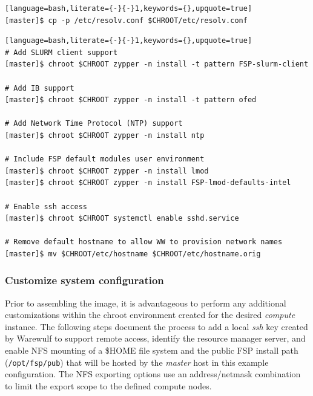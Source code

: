 \documentclass[letterpaper]{article}
\begin{document}
\begin{lstlisting}[language=bash,literate={-}{-}1,keywords={},upquote=true]
[master]$ cp -p /etc/resolv.conf $CHROOT/etc/resolv.conf
\end{lstlisting}


\begin{lstlisting}[language=bash,literate={-}{-}1,keywords={},upquote=true]
# Add SLURM client support
[master]$ chroot $CHROOT zypper -n install -t pattern FSP-slurm-client

# Add IB support
[master]$ chroot $CHROOT zypper -n install -t pattern ofed

# Add Network Time Protocol (NTP) support
[master]$ chroot $CHROOT zypper -n install ntp

# Include FSP default modules user environment
[master]$ chroot $CHROOT zypper -n install lmod 
[master]$ chroot $CHROOT zypper -n install FSP-lmod-defaults-intel

# Enable ssh access 
[master]$ chroot $CHROOT systemctl enable sshd.service

# Remove default hostname to allow WW to provision network names
[master]$ mv $CHROOT/etc/hostname $CHROOT/etc/hostname.orig
\end{lstlisting}


\subsubsection{Customize system configuration} \label{sec:master_customization}

Prior to assembling the image, it is advantageous to perform any additional
customizations within the chroot environment created for the desired {\em
  compute} instance. The following steps document the process to add a local
{\em ssh} key created by Warewulf to support remote access, identify the
resource manager server, and enable NFS mounting of a \$HOME file system and
the public FSP install path (\texttt{/opt/fsp/pub}) that will be hosted by the
{\em master} host in this example configuration.  The NFS exporting options use
an address/netmask combination to limit the export scope to the defined compute nodes.

\end{document}
